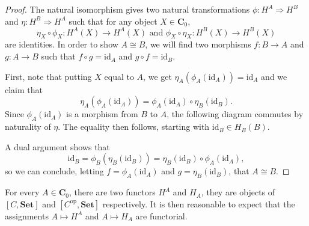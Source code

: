 \documentclass{article}
\theoremstyle{definition}
\theoremstyle{remark}
\newcommand{\id}{\text{id}}
\newcommand{\op}[1]{#1^{\text{op}}}
\begin{document}
\begin{proof}
	The natural isomorphism gives two natural transformations $\phi: H^A \Rightarrow H^B$ and $\eta: H^B \Rightarrow H^A$ such that for any object $X \in \mathbf{C}_0$, \[\eta_X \circ \phi_X:H^A(X)\rightarrow H^A(X) \text{  and  } \phi_X \circ \eta_X:H^B(X) \rightarrow H^B(X)\] are identities. In order to show $A \cong B$, we will find two morphisms $f:B\rightarrow A$ and $g:A\rightarrow B$ such that $f\circ g = \id_A$ and $g\circ f = \id_B$.
	
	First, note that putting $X$ equal to $A$, we get $\eta_A(\phi_A(\id_A)) = \id_A$ and we claim that \[\eta_A(\phi_A(\id_A)) =\phi_A(\id_A) \circ \eta_B(\id_B).\]
	Since $\phi_A(\id_A)$ is a morphism from $B$ to $A$, the following diagram commutes by naturality of $\eta$. The equality then follows, starting with $\id_B \in H_B(B)$.
	\begin{figure}[h]
		\centering
	\end{figure}

	A dual argument shows that \[\id_B = \phi_B(\eta_B(\id_B)) =  \eta_B(\id_B) \circ \phi_A(\id_A),\]
	so we can conclude, letting $f = \phi_A(\id_A)$ and $g= \eta_B(\id_B)$, that $A \cong B$.
\end{proof}

For every $A \in \mathbf{C}_0$, there are two functors $H^A$ and $H_A$, they are objects of $[C, \textbf{Set}]$ and $[\op{C}, \textbf{Set}]$ respectively. It is then reasonable to expect that the assignments $A \mapsto H^A$ and $A \mapsto H_A$ are functorial.
\end{document}
